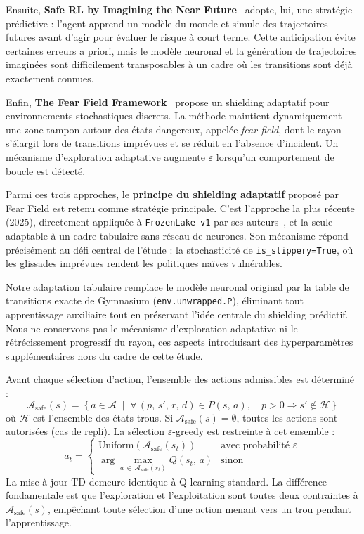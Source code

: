\documentclass{article}
\begin{document}
Ensuite, \textbf{Safe RL by Imagining the Near Future}~\citep{Future2022} adopte, lui, une stratégie prédictive : l'agent apprend un modèle du monde et simule des trajectoires futures avant d'agir pour évaluer le risque à court terme. Cette anticipation évite certaines erreurs a priori, mais le modèle neuronal et la génération de trajectoires imaginées sont difficilement transposables à un cadre où les transitions sont déjà exactement connues.

Enfin, \textbf{The Fear Field Framework}~\citep{Fearfield2025} propose un shielding adaptatif pour environnements stochastiques discrets. La méthode maintient dynamiquement une zone tampon autour des états dangereux, appelée \textit{fear field}, dont le rayon s'élargit lors de transitions imprévues et se réduit en l'absence d'incident. Un mécanisme d'exploration adaptative augmente $\varepsilon$ lorsqu'un comportement de boucle est détecté.

Parmi ces trois approches, le \textbf{principe du shielding adaptatif} proposé par Fear Field est retenu comme stratégie principale. C'est l'approche la plus récente (2025), directement appliquée à \texttt{FrozenLake-v1} par ses auteurs~\citep{Fearfield2025}, et la seule adaptable à un cadre tabulaire sans réseau de neurones. Son mécanisme répond précisément au défi central de l'étude : la stochasticité de \texttt{is\_slippery=True}, où les glissades imprévues rendent les politiques naïves vulnérables.

Notre adaptation tabulaire remplace le modèle neuronal original par la table de transitions exacte de Gymnasium (\texttt{env.unwrapped.P}), éliminant tout apprentissage auxiliaire tout en préservant l'idée centrale du shielding prédictif. Nous ne conservons pas le mécanisme d'exploration adaptative ni le rétrécissement progressif du rayon, ces aspects introduisant des hyperparamètres supplémentaires hors du cadre de cette étude.

Avant chaque sélection d'action, l'ensemble des actions admissibles est déterminé :
\begin{equation}
  \mathcal{A}_{\text{safe}}(s) = \left\{ a \in \mathcal{A} \;\middle|\;
  \forall\, (p,\, s',\, r,\, d) \in P(s,\, a),\quad p > 0
  \Rightarrow s' \notin \mathcal{H} \right\}
\end{equation}
où $\mathcal{H}$ est l'ensemble des états-trous. Si $\mathcal{A}_{\text{safe}}(s) = \emptyset$, toutes les actions sont autorisées (cas de repli). La sélection $\varepsilon$-greedy est restreinte à cet ensemble :
\begin{equation}
  a_t = \begin{cases}
    \text{Uniform}\!\left(\mathcal{A}_{\text{safe}}(s_t)\right) & \text{avec probabilité } \varepsilon \\[4pt]
    \displaystyle\arg\max_{a\,\in\,\mathcal{A}_{\text{safe}}(s_t)} Q(s_t,\, a) & \text{sinon}
  \end{cases}
\end{equation}
La mise à jour TD demeure identique à Q-learning standard. La différence fondamentale est que l'exploration et l'exploitation sont toutes deux contraintes à $\mathcal{A}_{\text{safe}}(s)$, empêchant toute sélection d'une action menant vers un trou pendant l'apprentissage.
\end{document}
